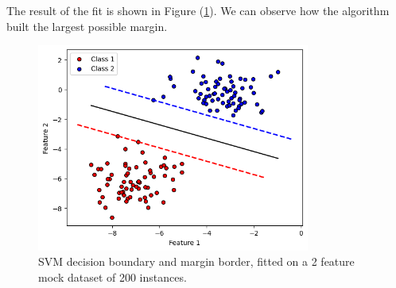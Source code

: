 \documentclass[12pt]{article}
\begin{document}
The result of the fit is shown in Figure (\ref{fig:classical svm mock}). We can observe how the algorithm built the largest possible margin. 


\begin{figure}[h!]
    \centering
    \includegraphics[width=0.8\textwidth]{images/classicalsvm.png}
    \caption{SVM decision boundary and margin border, fitted on a 2 feature mock dataset of 200 instances.}
    \label{fig:classical svm mock}
\end{figure}
\end{document}
